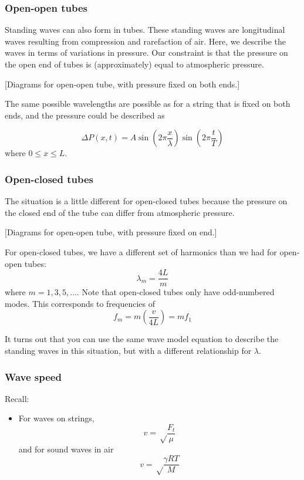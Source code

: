 \subsubsection{Open-open tubes}
Standing waves can also form in tubes. These standing waves are longitudinal waves resulting from compression and rarefaction of air. Here, we describe the waves in terms of variations in pressure. Our constraint is that the pressure on the open end of tubes is (approximately) equal to atmospheric pressure. 

[Diagrams for open-open tube, with pressure fixed on both ends.]\nopagebreak
\vspace{8cm}

The same possible wavelengths are possible as for a string that is fixed on both ends, and the pressure could be described as

$$\Delta P(x,t)=A\sin\left(2\pi\frac{x}{\lambda}\right)\sin\left(2\pi\frac{t}{T}\right)$$
where $0\leq x \leq L$.

\subsubsection{Open-closed tubes}
The situation is a little different for open-closed tubes because the pressure on the closed end of the tube can differ from atmospheric pressure.

[Diagrams for open-open tube, with pressure fixed on end.]\nopagebreak
\vspace{8cm}


For open-closed tubes, we have a different set of harmonics than we had for open-open tubes:
$$\lambda_m=\frac{4L}{m}$$
where $m=1,3,5,\dots$. Note that open-closed tubes only have odd-numbered modes. This corresponds to frequencies of
  $$f_m=m\left(\frac{v}{4L}\right)=mf_1$$

It turns out that you can use the same wave model equation to describe the standing waves in this situation, but with a different relationship for $\lambda$.

\subsubsection{Wave speed}
Recall:
\begin{itemize}
\item For waves on strings,
  $$v=\sqrt\frac{F_t}{\mu}$$
  and for sound waves in air
  $$v=\sqrt\frac{\gamma RT}{M}$$
\end{itemize}
  
